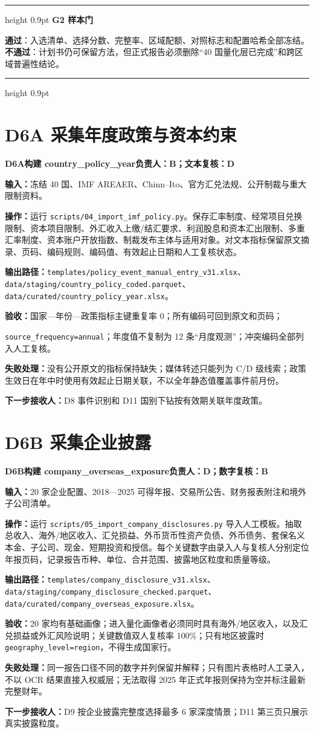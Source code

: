 \documentclass[UTF8,fontset=windows,12pt,openany]{ctexbook}
\newenvironment{gatebox}[1][]{%
  \par\medskip\noindent\begin{center}\begin{minipage}{0.93\textwidth}%
  \color{GoldLine}\hrule height 0.9pt\vspace{0.45em}%
  \textbf{#1}\par\smallskip\color{black}%
}{%
  \par\vspace{0.35em}\color{GoldLine}\hrule height 0.9pt%
  \end{minipage}\end{center}\medskip%
}
\newcommand{\Field}[1]{{\small\nolinkurl{#1}}}
\newcommand{\File}[1]{{\small\nolinkurl{#1}}}
\newcommand{\StepTitle}[3]{%
  \noindent\colorbox{DeepNavy}{\parbox{0.965\textwidth}{\color{white}\Large\bfseries #1\quad #2\hfill\normalsize #3}}\par\medskip
}
\newcommand{\CardRow}[2]{\noindent\textbf{#1：}#2\par}
\newcommand{\Pass}{\textcolor{DeepNavy}{\textbf{通过}}}
\newcommand{\Fail}{\textcolor{TextGray}{\textbf{不通过}}}
\begin{document}
\begin{gatebox}[G2 样本门]
\Pass：入选清单、选择分数、完整率、区域配额、对照标志和配置哈希全部冻结。\Fail：计划书仍可保留方法，但正式报告必须删除“40 国量化层已完成”和跨区域普遍性结论。
\end{gatebox}

\newpage
\section{D6A 采集年度政策与资本约束}
\StepTitle{D6A}{构建 country\_policy\_year}{负责人：B；文本复核：D}
\CardRow{输入}{冻结 40 国、IMF AREAER、Chinn--Ito、官方汇兑法规、公开制裁与重大限制资料。}
\CardRow{操作}{运行 \File{scripts/04_import_imf_policy.py}。保存汇率制度、经常项目兑换限制、资本项目限制、外汇收入上缴/结汇要求、利润股息和资本汇出限制、多重汇率制度、资本账户开放指数、制裁发布主体与适用对象。对文本指标保留原文摘录、页码、编码规则、编码值、有效起止日期和人工复核状态。}
\CardRow{输出路径}{\File{templates/policy_event_manual_entry_v31.xlsx}、\File{data/staging/country_policy_coded.parquet}、\File{data/curated/country_policy_year.xlsx}。}
\CardRow{验收}{国家—年份—政策指标主键重复率 0；所有编码可回到原文和页码；\par\Field{source_frequency=annual}；年度值不复制为 12 条“月度观测”；冲突编码全部列入人工复核。}
\CardRow{失败处理}{没有公开原文的指标保持缺失；媒体转述只能列为 C/D 级线索；政策生效日在年中时使用有效起止日期关联，不以全年静态值覆盖事件前月份。}
\CardRow{下一步接收人}{D8 事件识别和 D11 国别下钻按有效期关联年度政策。}

\section{D6B 采集企业披露}
\StepTitle{D6B}{构建 company\_overseas\_exposure}{负责人：D；数字复核：B}
\CardRow{输入}{20 家企业配置、2018—2025 可得年报、交易所公告、财务报表附注和境外子公司清单。}
\CardRow{操作}{运行 \File{scripts/05_import_company_disclosures.py} 导入人工模板。抽取总收入、海外/地区收入、汇兑损益、外币货币性资产负债、外币债务、套保名义本金、子公司、现金、短期投资和授信。每个关键数字由录入人与复核人分别定位年报页码，记录报告币种、单位、合并范围、披露地区粒度和质量等级。}
\CardRow{输出路径}{\File{templates/company_disclosure_v31.xlsx}、\File{data/staging/company_disclosure_checked.parquet}、\File{data/curated/company_overseas_exposure.xlsx}。}
\CardRow{验收}{20 家均有基础画像；进入量化画像者必须同时具有海外/地区收入，以及汇兑损益或外汇风险说明；关键数值双人复核率 100\%；只有地区披露时 \Field{geography_level=region}，不得生成国家行。}
\CardRow{失败处理}{同一报告口径不同的数字并列保留并解释；只有图片表格时人工录入，不以 OCR 结果直接入权威层；无法取得 2025 年正式年报则保持为空并标注最新完整财年。}
\CardRow{下一步接收人}{D9 按企业披露完整度选择最多 6 家深度情景；D11 第三页只展示真实披露粒度。}
\end{document}
